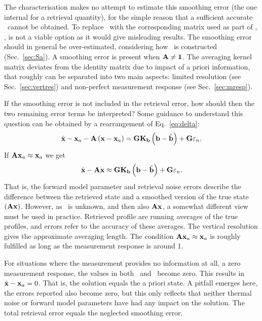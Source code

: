 The characterisation makes no attempt to estimate this smoothing error (the one
internal for a retrieval quantity), for the simple reason that a sufficient
accurate \aCvrMtr{\SttVct}\ cannot be obtained. To replace \aCvrMtr{\SttVct}\
with the corresponding matrix used as part of \OEM, , is not a
viable option as it would give misleading results. The smoothing error should
in general be over-estimated, considering how \aCvrMtr{\SttVct}\ is constructed
(Sec.~\ref{sec:Sa}). A smoothing error is present when $\mathbf{A}\neq\mathbf{1}$.
The averaging kernel matrix deviates from the identity matrix due to impact of
a priori information, that roughly can be separated into two main aspects:
limited resolution (see Sec.~\ref{sec:vertres}) and non-perfect measurement
response (see Sec.~\ref{sec:mresp}).

If the smoothing error is not included in the retrieval error, how should then
the two remaining error terms be interpreted? Some guidance to understand this
question can be obtained by a rearrangement of Eq.~\ref{eq:delta}:
\begin{equation}
  \hat{\mathbf{x}} -\mathbf{x}_{a} - \mathbf{A}\left( \mathbf{x}-\mathbf{x}_{a} \right) = 
    \mathbf{G}\mathbf{K}_{\mathbf{b}}\left(\mathbf{b}-\hat{\mathbf{b}}\right) +
    \mathbf{G}\varepsilon_n.
\end{equation}
If $\mathbf{A}\mathbf{x}_{a}\approx\mathbf{x}_{a}$ we get
\begin{equation}
  \hat{\mathbf{x}} - \mathbf{A}\mathbf{x} \approx 
    \mathbf{G}\mathbf{K}_{\mathbf{b}}\left(\mathbf{b}-\hat{\mathbf{b}}\right) +
    \mathbf{G}\varepsilon_n.
\end{equation}
That is, the forward model parameter and retrieval noise errors describe the
difference between the retrieved state and a smoothed version of the true state
$(\mathbf{A}\mathbf{x})$. However, as \SttVct\ is unknown, and then also
$\mathbf{A}\mathbf{x}$, a somewhat different view must be used in practice.
Retrieved profile are running averages of the true profiles, and errors refer
to the accuracy of these averages. The vertical resolution gives the
approximate averaging length. The condition
$\mathbf{A}\mathbf{x}_{a}\approx\mathbf{x}_{a}$ is roughly fulfilled as long as the
measurement response is around 1.

For situations where the measurement provides no information at all, a zero
measurement response, the values in both \CtrFncMtr\ and \AvrKrnMtr\ become
zero. This results in $\hat{\mathbf{x}} - \mathbf{x}_{a} = 0$. That is, the solution equals
the a priori state. A pitfall emerges here, the errors reported also become
zero, but this only reflects that neither thermal noise or forward model
parameters have had any impact on the solution. The total retrieval error
equals the neglected smoothing error.



